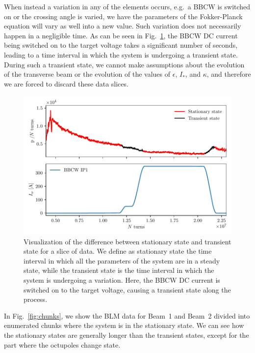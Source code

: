 When instead a variation in any of the elements occurs, e.g.\ a BBCW is switched on or the crossing angle is varied, we have the parameters of the Fokker-Planck equation will vary as well into a new value. Such variation does not necessarily happen in a negligible time. As can be seen in Fig.~\ref{fig:transient-state}, the BBCW DC current being switched on to the target voltage takes a significant number of seconds, leading to a time interval in which the system is undergoing a transient state. During such a transient state, we cannot make assumptions about the evolution of the transverse beam or the evolution of the values of $\epsilon$, $I_\ast$, and $\kappa$, and therefore we are forced to discard these data slices.

\begin{figure}[hpt]
    \centering
    \includegraphics[width=1.0\textwidth]{5_wire_compensators_LHC/figs/stationary_transient.pdf}
    \caption{Visualization of the difference between stationary state and transient state for a slice of data. We define as stationary state the time interval in which all the parameters of the system are in a steady state, while the transient state is the time interval in which the system is undergoing a variation. Here, the BBCW DC current is switched on to the target voltage, causing a transient state along the process.}
    \label{fig:transient-state}
\end{figure}

In Fig.~\ref{fig:chunks}, we show the BLM data for Beam~1 and Beam~2 divided into enumerated chunks where the system is in the stationary state. We can see how the stationary states are generally longer than the transient states, except for the part where the octupoles change state.

